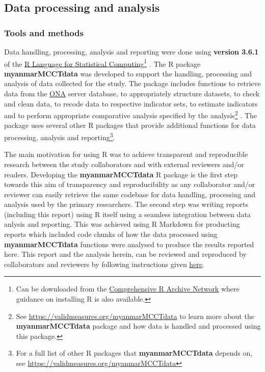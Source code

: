 \documentclass[12pt,a4paper]{article}
\let\rmarkdownfootnote\footnote%
\def\footnote{\protect\rmarkdownfootnote}
\begin{document}
\hypertarget{analysis}{%
\subsection{Data processing and analysis}\label{analysis}}

\hypertarget{processing-tools}{%
\subsubsection{Tools and methods}\label{processing-tools}}

Data handling, processing, analysis and reporting were done using \textbf{version 3.6.1} of the \href{https://cran.r-project.org}{R Language for Statistical Computing}\footnote{Can be downloaded from the \href{https://cran.r-project.org}{Comprehensive R Archive Network} where guidance on installing R is also available.} \citep{R2019}. The R package \textbf{myanmarMCCTdata} was developed to support the handling, processing and analysis of data collected for the study. The package includes functions to retrieve data from the \href{https://ona.io}{ONA} server database, to appropriately structure datasets, to check and clean data, to recode data to respective indicator sets, to estimate indicators and to perform appropriate comparative analysis specified by the analysis\footnote{See \url{https://validmeasures.org/myanmarMCCTdata} to learn more about the \textbf{myanmarMCCTdata} package and how data is handled and processed using this package.} \citep{myanmarData2019}. The package uses several other R packages that provide additional functions for data processing, analysis and reporting\footnote{For a full list of other R packages that \textbf{myanmarMCCTdata} depends on, see \url{https://validmeasures.org/myanmarMCCTdata}}.

The main motivation for using R was to achieve transparent and reproducible research between the study collaborators and with external reviewers and/or readers. Developing the \textbf{myanmarMCCTdata} R package is the first step towards this aim of transparency and reproducibility as any collaborator and/or reviewer can easily retrieve the same codebase for data handling, processing and analysis used by the primary researchers. The second step was writing reports (including this report) using R itself using a seamless integration between data anlysis and reporting. This was achieved using R Markdown \citep{rmarkdown2018} for producting reports which included code chunks of how the data processed using \textbf{myanmarMCCTdata} functions were analysed to produce the results reported here. This report and the analysis herein, can be reviewed and reproduced by collaborators and reviewers by following instructions given \href{https://github.com/validmeasures/myanmarMCCTkayin}{here}.
\end{document}
